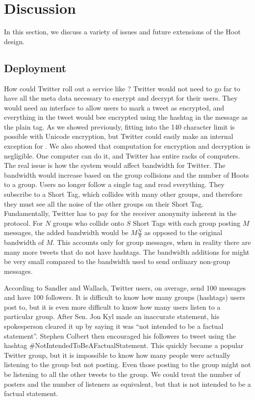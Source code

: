 \section{Discussion} \label{sec:discuss}

In this section, we discuss a variety of issues and future extensions of the Hoot design.

\subsection{Deployment}

How could Twitter roll out a service like \hoot? Twitter would not need to go far to have all the meta data necessary to encrypt and decrypt for their users. They would need an interface to allow users to mark a tweet as encrypted, and everything in the tweet would bee encrypted using the hashtag in the message as the plain tag. As we showed previously, fitting into the 140 character limit is possible with Unicode encryption, but Twitter could easily make an internal exception for \hoot. We also showed that computation for encryption and decryption is negligible. One computer can do it, and Twitter has entire racks of computers. The real issue is how the \hoot system would affect bandwidth for Twitter. The bandwidth would increase based on the group collisions and the number of Hoots to a group. Users no longer follow a single tag and read everything. They subscribe to a Short Tag, which collides with many other groups, and therefore they must see all the noise of the other groups on their Short Tag. Fundamentally, Twitter has to pay for the receiver anonymity inherent in the \hoot protocol. 
For $N$ groups who collide onto $S$ Short Tags with each group posting $M$ messages, the added bandwidth would be $M\frac{N}{S}$ as opposed to the original bandwidth of $M$. This accounts only for group messages, when in reality there are many more tweets that do not have hashtags. The bandwidth additions for \hoot might be very small compared to the bandwidth used to send ordinary non-group messages.

According to Sandler and Wallach\cite{sandler09}, Twitter users, on average, send 100 messages and have 100 followers. It is difficult to know how many groups (hashtags) users post to, but it is even more difficult to know how many users listen to a particular group. After Sen. Jon Kyl made an inaccurate statement, his spokesperson cleared it up by saying it was ``not intended to be a factual statement''\cite{politico11}. Stephen Colbert then encouraged his followers to tweet using the hashtag \#NotIntendedToBeAFactualStatement. This quickly became a popular Twitter group, but it is impossible to know how many people were actually listening to the group but not posting. Even those posting to the group might not be listening to all the other tweets to the group. We could treat the number of posters and the number of listeners as equivalent, but that is not intended to be a factual statement.

